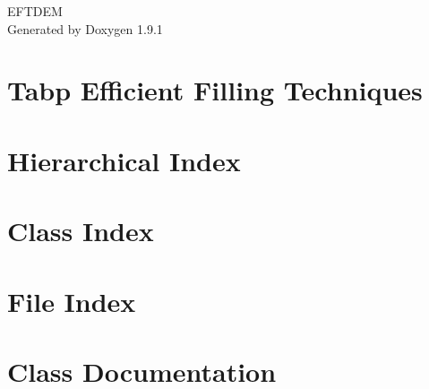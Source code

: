 \let\mypdfximage\pdfximage\def\pdfximage{\immediate\mypdfximage}\documentclass[twoside]{book}
\newcommand{\+}{\discretionary{\mbox{\scriptsize$\hookleftarrow$}}{}{}}
\newcommand{\clearemptydoublepage}{%
  \newpage{\pagestyle{empty}\cleardoublepage}%
}
\begin{document}
\raggedbottom

\hypersetup{pageanchor=false,
             bookmarksnumbered=true,
             pdfencoding=unicode
            }
\begin{titlepage}
\vspace*{7cm}
\begin{center}%
{\Large EFTDEM }\\
\vspace*{1cm}
{\large Generated by Doxygen 1.9.1}\\
\end{center}
\end{titlepage}
\clearemptydoublepage
{}
\tableofcontents
\clearemptydoublepage
{}
\hypersetup{pageanchor=true}

\chapter{Tabp Efficient Filling Techniques}
\label{md__media_stastez_data__code__e_f_t_d_e_m__r_e_a_d_m_e}

\chapter{Hierarchical Index}

\chapter{Class Index}

\chapter{File Index}

\chapter{Class Documentation}






































\end{document}
